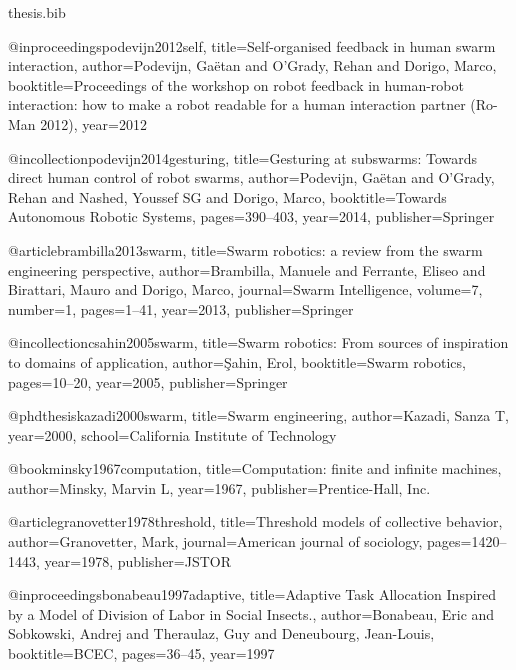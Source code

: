 \documentclass[a4paper, 12pt]{report}
\begin{document}
\newpage


\begin{filecontents}{thesis.bib}

@inproceedings{podevijn2012self,
  title={Self-organised feedback in human swarm interaction},
  author={Podevijn, Ga{\"e}tan and O’Grady, Rehan and Dorigo, Marco},
  booktitle={Proceedings of the workshop on robot feedback in human-robot interaction: how to make a robot readable for a human interaction partner (Ro-Man 2012)},
  year={2012}
}

@incollection{podevijn2014gesturing,
  title={Gesturing at subswarms: Towards direct human control of robot swarms},
  author={Podevijn, Ga{\"e}tan and O’Grady, Rehan and Nashed, Youssef SG and Dorigo, Marco},
  booktitle={Towards Autonomous Robotic Systems},
  pages={390--403},
  year={2014},
  publisher={Springer}
}

@article{brambilla2013swarm,
  title={Swarm robotics: a review from the swarm engineering perspective},
  author={Brambilla, Manuele and Ferrante, Eliseo and Birattari, Mauro and Dorigo, Marco},
  journal={Swarm Intelligence},
  volume={7},
  number={1},
  pages={1--41},
  year={2013},
  publisher={Springer}
}

@incollection{csahin2005swarm,
  title={Swarm robotics: From sources of inspiration to domains of application},
  author={{\c{S}}ahin, Erol},
  booktitle={Swarm robotics},
  pages={10--20},
  year={2005},
  publisher={Springer}
}

@phdthesis{kazadi2000swarm,
  title={Swarm engineering},
  author={Kazadi, Sanza T},
  year={2000},
  school={California Institute of Technology}
}

@book{minsky1967computation,
  title={Computation: finite and infinite machines},
  author={Minsky, Marvin L},
  year={1967},
  publisher={Prentice-Hall, Inc.}
}

@article{granovetter1978threshold,
  title={Threshold models of collective behavior},
  author={Granovetter, Mark},
  journal={American journal of sociology},
  pages={1420--1443},
  year={1978},
  publisher={JSTOR}
}

@inproceedings{bonabeau1997adaptive,
  title={Adaptive Task Allocation Inspired by a Model of Division of Labor in Social Insects.},
  author={Bonabeau, Eric and Sobkowski, Andrej and Theraulaz, Guy and Deneubourg, Jean-Louis},
  booktitle={BCEC},
  pages={36--45},
  year={1997}
}


\end{filecontents}
\end{document}
